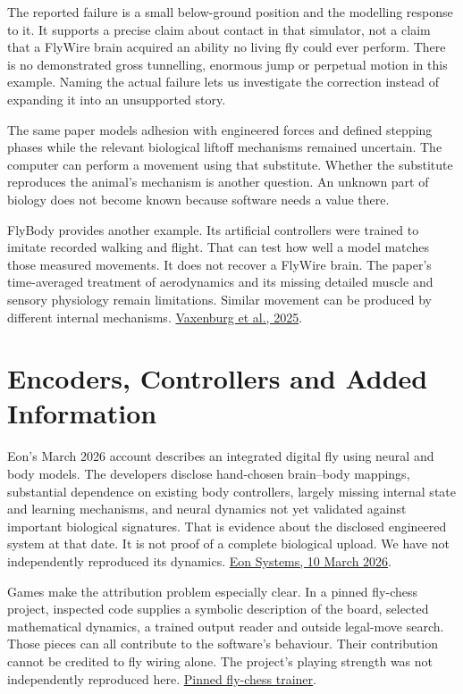 The reported failure is a small below-ground position and the modelling response to it. It supports a precise claim about contact in that simulator, not a claim that a FlyWire brain acquired an ability no living fly could ever perform. There is no demonstrated gross tunnelling, enormous jump or perpetual motion in this example. Naming the actual failure lets us investigate the correction instead of expanding it into an unsupported story.\par

The same paper models adhesion with engineered forces and defined stepping phases while the relevant biological liftoff mechanisms remained uncertain. The computer can perform a movement using that substitute. Whether the substitute reproduces the animal's mechanism is another question. An unknown part of biology does not become known because software needs a value there.\par

FlyBody provides another example. Its artificial controllers were trained to imitate recorded walking and flight. That can test how well a model matches those measured movements. It does not recover a FlyWire brain. The paper's time-averaged treatment of aerodynamics and its missing detailed muscle and sensory physiology remain limitations. Similar movement can be produced by different internal mechanisms. \href{https://pmc.ncbi.nlm.nih.gov/articles/PMC12310536/}{Vaxenburg et al., 2025}.\par

\section{Encoders, Controllers and Added Information}

Eon's March 2026 account describes an integrated digital fly using neural and body models. The developers disclose hand-chosen brain--body mappings, substantial dependence on existing body controllers, largely missing internal state and learning mechanisms, and neural dynamics not yet validated against important biological signatures. That is evidence about the disclosed engineered system at that date. It is not proof of a complete biological upload. We have not independently reproduced its dynamics. \href{https://eon.systems/updates/embodied-brain-emulation}{Eon Systems, 10 March 2026}.\par

Games make the attribution problem especially clear. In a pinned fly-chess project, inspected code supplies a symbolic description of the board, selected mathematical dynamics, a trained output reader and outside legal-move search. Those pieces can all contribute to the software's behaviour. Their contribution cannot be credited to fly wiring alone. The project's playing strength was not independently reproduced here. \href{https://github.com/mncrftfrcnm/making-fly-play-chess/blob/b97dfefbf9b8850f3cdf6b412c2ed840be94e260/scripts/fly_chess_trainer.py}{Pinned fly-chess trainer}.\par

